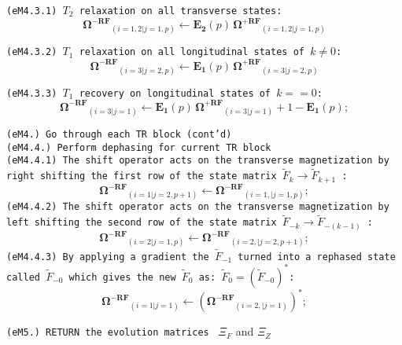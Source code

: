\begin{algorithm}
{            %
            \nonl \quad \quad \texttt{(eM4.3.1) $T_2$ relaxation on all transverse states: }
            \nonl \[ \bm{\Omega^{-RF}}_{(i=1,2 | j=1,p)} \gets\bm{E_2}(p) \, \bm{\Omega^{+RF}}_{(i=1,2 | j=1,p)} \]
            
            \nonl \quad \quad \texttt{(eM4.3.2) $T_1$ relaxation on all longitudinal states of $k \neq 0$: }
            \nonl \[ \bm{\Omega^{-RF}}_{(i=3 | j=2,p)} \gets \bm{E_1}(p) \, \bm{\Omega^{+RF}}_{(i=3 | j=2,p)} \]
            
            \nonl \quad \quad \texttt{(eM4.3.3) $T_1$ recovery on longitudinal states of $k == 0$: }
            \nonl \[ \bm{\Omega^{-RF}}_{(i=3 | j=1)} \gets \bm{E_1}(p) \, \bm{\Omega^{+RF}}_{(i=3 | j=1)}  + 1 - \bm{E_1}(p); \]
        
    \nonl }

    
\end{algorithm}


\begin{algorithm}
    \LinesNumberedHidden
    
    \nonl \texttt{(eM4.) Go through each TR block (cont'd)} \\
    \nonl {} 
    {
        \nonl \texttt{(eM4.4.) Perform dephasing for current TR block} \\
        \nonl {} 
        { 
            \nonl \texttt{(eM4.4.1) The shift operator acts on the transverse magnetization by right shifting the first row of the state matrix $\widetilde{F}_k \rightarrow \widetilde{F}_{k+1}$ : }
            \nonl \[ \bm{\Omega^{-RF}}_{(i=1 | j=2,p+1)}  \gets \bm{\Omega^{-RF}}_{(i=1, | j=1,p)}; \] 
            \nonl \texttt{(eM4.4.2) The shift operator acts on the transverse magnetization by left shifting the second row of the state matrix $\widetilde{F}_{-k} \rightarrow \widetilde{F}_{-(k-1)}$ : }
            \[ \bm{\Omega^{-RF}}_{(i=2 | j=1,p)}  \gets \bm{\Omega^{-RF}}_{(i=2, | j=2,p+1)}; \] 
            \nonl \texttt{(eM4.4.3) By applying a gradient the $\widetilde{F}_{-1}$ turned into a rephased state called $\widetilde{F}_{-0}$ which gives the new $\widetilde{F}_0$ as: $\widetilde{F}_0 = (\widetilde{F}_{-0})^*$: }
            \nonl \[ \bm{\Omega^{-RF}}_{(i=1 | j=1)}  \gets (\bm{\Omega^{-RF}}_{(i=2, | j=1)})^*; \]  
        \nonl }
    \nonl }
        
    \nonl \texttt{(eM5.) RETURN the evolution matrices } $\Xi_F$ and $\Xi_Z$ \;    

\end{algorithm}